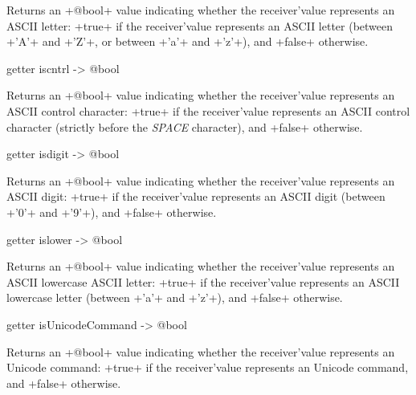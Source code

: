 Returns an \ggs+@bool+ value indicating whether the receiver'value represents an ASCII letter: \ggs+true+ if the receiver'value represents an ASCII letter (between \ggs+'A'+ and \ggs+'Z'+, or between \ggs+'a'+ and \ggs+'z'+), and \ggs+false+ otherwise.





\begin{galgas}
getter iscntrl -> @bool
\end{galgas}

Returns an \ggs+@bool+ value indicating whether the receiver'value represents an ASCII control character: \ggs+true+ if the receiver'value represents an ASCII control character (strictly before the \emph{SPACE} character), and \ggs+false+ otherwise.






\begin{galgas}
getter isdigit -> @bool
\end{galgas}

Returns an \ggs+@bool+ value indicating whether the receiver'value represents an ASCII digit: \ggs+true+ if the receiver'value represents an ASCII digit (between \ggs+'0'+ and \ggs+'9'+), and \ggs+false+ otherwise.






\begin{galgas}
getter islower -> @bool
\end{galgas}

Returns an \ggs+@bool+ value indicating whether the receiver'value represents an ASCII lowercase ASCII letter: \ggs+true+ if the receiver'value represents an ASCII lowercase letter (between \ggs+'a'+ and \ggs+'z'+), and \ggs+false+ otherwise.







\begin{galgas}
getter isUnicodeCommand -> @bool
\end{galgas}

Returns an \ggs+@bool+ value indicating whether the receiver'value represents an Unicode command: \ggs+true+ if the receiver'value represents an Unicode command, and \ggs+false+ otherwise.






